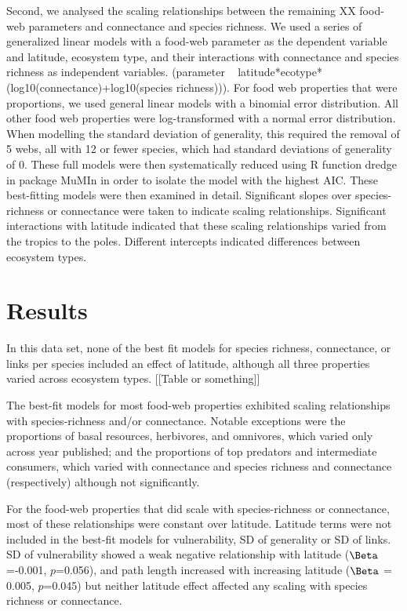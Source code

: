 Second, we analysed the scaling relationships between the remaining XX food-
web parameters and connectance and species richness. We used a series of
generalized linear models with a food-web parameter as the dependent variable
and latitude, ecosystem type, and their interactions with connectance and
species richness as independent variables. (parameter ~
latitude*ecotype*(log10(connectance)+log10(species richness))). For food web
properties that were proportions, we used general linear models with a
binomial error distribution. All other food web properties were log-transformed with a normal error distribution.
When modelling the standard deviation of generality, this
required the removal of 5 webs, all with 12 or fewer species, which had
standard deviations of generality of 0. These full models were then
systematically reduced using R function dredge \cite{} in package MuMIn
\cite{} in order to isolate the model with the highest AIC. These best-fitting models were 
then examined in detail. Significant slopes over species-richness or connectance were taken to indicate scaling
relationships. Significant interactions with latitude indicated that these scaling relationships varied from the tropics
to the poles. Different intercepts indicated differences between ecosystem types.


\section*{Results}

In this data set, none of the best fit models for species richness, connectance, or links per species included an 
effect of latitude, although all three properties varied across ecosystem types. [[Table or something]]


The best-fit models for most food-web properties exhibited scaling relationships with species-richness and/or 
connectance. Notable exceptions were the proportions of basal resources, herbivores, and omnivores, which varied only 
across year published; and the proportions of top predators and intermediate consumers, which varied with connectance 
and species richness and connectance (respectively) although not significantly.


For the food-web properties that did scale with species-richness or connectance, most of these relationships were 
constant over latitude. Latitude terms were not included in the best-fit models for vulnerability, SD of generality or 
SD of links. SD of vulnerability showed a weak negative relationship with latitude ($\Beta$=-0.001, $p$=0.056), 
and path length increased with increasing 
latitude ($\Beta$ = 0.005, $p$=0.045) but neither latitude effect affected any scaling with species richness or 
connectance.



